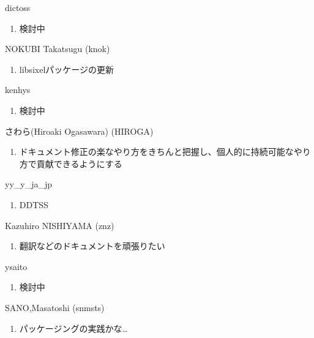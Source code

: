 \begin{prework}{ dictoss }
  \begin{enumerate}
  \item 検討中
  \end{enumerate}
\end{prework}

\begin{prework}{ NOKUBI Takatsugu (knok) }
  \begin{enumerate}
  \item libsixelパッケージの更新
  \end{enumerate}
\end{prework}

\begin{prework}{ kenhys }
  \begin{enumerate}
  \item 検討中
  \end{enumerate}
\end{prework}

\begin{prework}{ さわら(Hiroaki Ogasawara) (HIROGA) }
  \begin{enumerate}
  \item ドキュメント修正の楽なやり方をきちんと把握し、個人的に持続可能なやり方で貢献できるようにする
  \end{enumerate}
\end{prework}

\begin{prework}{ yy\_y\_ja\_jp }
  \begin{enumerate}
  \item DDTSS
  \end{enumerate}
\end{prework}

\begin{prework}{ Kazuhiro NISHIYAMA (znz) }
  \begin{enumerate}
  \item 翻訳などのドキュメントを頑張りたい
  \end{enumerate}
\end{prework}

\begin{prework}{ ysaito }
  \begin{enumerate}
  \item 検討中
  \end{enumerate}
\end{prework}

\begin{prework}{ SANO,Masatoshi (snmsts) }
  \begin{enumerate}
  \item パッケージングの実践かな…
  \end{enumerate}
\end{prework}
